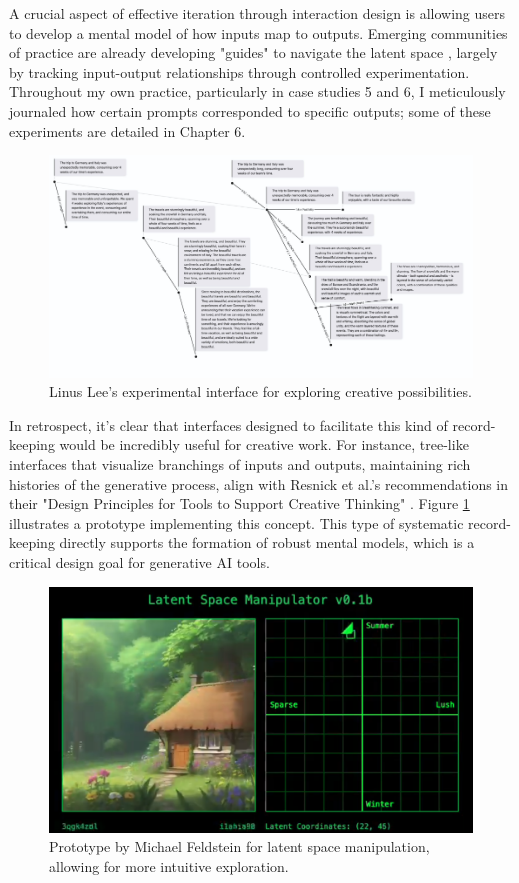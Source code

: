 A crucial aspect of effective iteration through interaction design is allowing users to develop a mental model of how inputs map to outputs. Emerging communities of practice are already developing "guides" to navigate the latent space \cite{Smith2022-dm}, largely by tracking input-output relationships through controlled experimentation. Throughout my own practice, particularly in case studies 5 and 6, I meticulously journaled how certain prompts corresponded to specific outputs; some of these experiments are detailed in Chapter 6.

\begin{figure}[H]
    \centering
    \includegraphics[width=0.8\linewidth]{linus.png}
    \caption{Linus Lee's experimental interface for exploring creative possibilities.}
    \label{fig:linus}
\end{figure}

In retrospect, it's clear that interfaces designed to facilitate this kind of record-keeping would be incredibly useful for creative work. For instance, tree-like interfaces that visualize branchings of inputs and outputs, maintaining rich histories of the generative process, align with Resnick et al.'s recommendations in their "Design Principles for Tools to Support Creative Thinking" \cite{Resnick2005-fs}. Figure \ref{fig:linus} illustrates a prototype implementing this concept. This type of systematic record-keeping directly supports the formation of robust mental models, which is a critical design goal for generative AI tools.

\begin{figure}[H]
    \centering
    \includegraphics[width=0.8\linewidth]{latentspacemanip.png}
    \caption{Prototype by Michael Feldstein for latent space manipulation, allowing for more intuitive exploration.}
    \label{fig:feldstein}
\end{figure}


